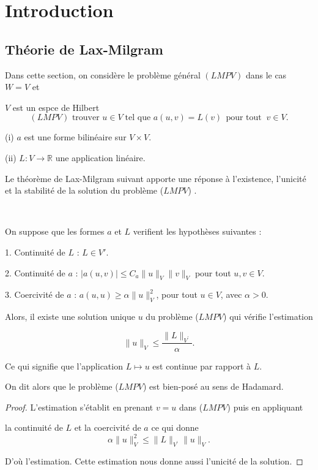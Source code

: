 \chapter{Introduction}
\section{ Théorie de Lax-Milgram}

Dans cette section, on considère le  problème général $(LMPV)$  dans le cas $W=V$ et 

$V$ est un espce de Hilbert
$$
(LMPV) \text{ trouver } u \in V\;  \text{tel que } a(u, v)=L(v) \;\, \text{pour tout}\;\;  v \in V.
$$



(i) $a$ est une forme bilinéaire  sur  $V\times V$. 

(ii) $L :V\longrightarrow \mathbb{R}$ une application linéaire.




	
Le théorème de Lax-Milgram suivant apporte une réponse à l'existence, l'unicité et la stabilité de la solution du problème ($LMPV$) .

\begin{theorem}\
	
On suppose que  les formes $a$ et $L$ verifient les hypothèses suivantes :

1. Continuité de $L$ : $L\in V'$.

2. Continuité de $a$ : $|a(u, v)| \leq C_{a}\|u\|_V \|v\|_{V}$ pour tout $u, v \in V$.

3. Coercivité de $a$ :  $ a(u, u) \geq \alpha\|u\|_{V}^{2}$,  pour tout $u \in V$,  avec $\alpha>0$.

Alors,  il existe une solution unique $u$ du problème ($LMPV$) qui vérifie l'estimation 

$$
\|u\|_{V} \leq \frac{\|L\|_{V^{\prime}}}{\alpha}.
$$

Ce qui signifie que l'application $L\longmapsto u$ est continue par rapport à $L$.  

On dit alors que le problème ($LMPV$)  est bien-posé au sens de Hadamard.
\end{theorem}

\begin{proof}
L'estimation  s'établit en prenant $v=u$ dans ($LMPV$) puis en appliquant 

la continuité de $L$ et la coercivité de $a$ ce qui donne
$$
\alpha\|u\|_{V}^{2} \leq \|L\|_{V^\prime}\|u\|_{V}.
$$

D'où l'estimation.   Cette estimation nous donne aussi l'unicité de la solution.
\end{proof}


